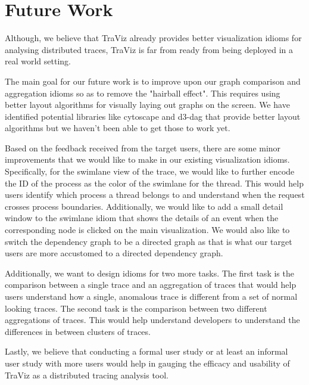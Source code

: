 \section{Future Work}

Although, we believe that TraViz already provides better visualization
idioms for analysing distributed traces, TraViz is far from ready from
being deployed in a real world setting.

The main goal for our future work is to improve upon our graph comparison
and aggregation idioms so as to remove the "hairball effect". This requires
using better layout algorithms for visually laying out graphs on the screen.
We have identified potential libraries like cytoscape and d3-dag that provide
better layout algorithms but we haven't been able to get those to work yet.

Based on the feedback received from the target users, there are some minor
improvements that we would like to make in our existing visualization idioms.
Specifically, for the swimlane view of the trace, we would like to further
encode the ID of the process as the color of the swimlane for the thread.
This would help users identify which process a thread belongs to and
understand when the request crosses process boundaries. Additionally, we would
like to add a small detail window to the swimlane idiom that shows the details
of an event when the corresponding node is clicked on the main visualization.
We would also like to switch the dependency graph to be a directed graph
as that is what our target users are more accustomed to a directed dependency
graph.

Additionally, we want to design idioms for two more tasks. The first task
is the comparison between a single trace and an aggregation of traces
that would help users understand how a single, anomalous trace is
different from a set of normal looking traces. The second task is the comparison
between two different aggregations of traces. This would help understand
developers to understand the differences in between clusters of traces.

Lastly, we believe that conducting a formal user study or at least an informal
user study with more users would help in gauging the efficacy and usability
of TraViz as a distributed tracing analysis tool.